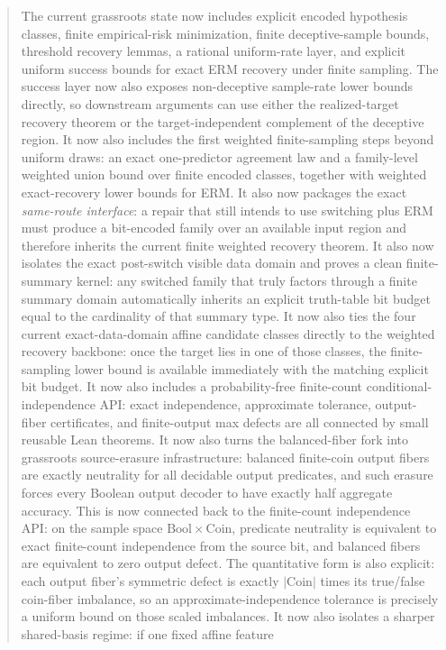 \documentclass[11pt]{article}
\theoremstyle{remark}
\begin{document}
\begin{abstract}
The current grassroots state now includes explicit encoded hypothesis classes,
finite empirical-risk minimization, finite deceptive-sample bounds, threshold
recovery lemmas, a rational uniform-rate layer, and explicit uniform success
bounds for exact ERM recovery under finite sampling.  The success layer now
also exposes non-deceptive sample-rate lower bounds directly, so downstream
arguments can use either the realized-target recovery theorem or the
target-independent complement of the deceptive region.  It now also includes
the first weighted finite-sampling steps beyond uniform draws: an exact
one-predictor agreement law and a family-level weighted union bound over finite
encoded classes, together with weighted exact-recovery lower bounds for ERM.
It also now packages the exact \emph{same-route interface}: a repair that still
intends to use switching plus ERM must produce a bit-encoded family over an
available input region and therefore inherits the current finite weighted
recovery theorem.
It also now isolates the exact post-switch visible data domain and proves a clean
finite-summary kernel: any switched family that truly factors through a finite
summary domain automatically inherits an explicit truth-table bit budget equal
to the cardinality of that summary type.
It now also ties the four current exact-data-domain affine candidate classes
directly to the weighted recovery backbone: once the target lies in one of
those classes, the finite-sampling lower bound is available immediately with the
matching explicit bit budget.
It now also includes a probability-free finite-count conditional-independence
API: exact independence, approximate tolerance, output-fiber certificates, and
finite-output max defects are all connected by small reusable Lean theorems.
It now also turns the balanced-fiber fork into grassroots source-erasure
infrastructure: balanced finite-coin output fibers are exactly neutrality for
all decidable output predicates, and such erasure forces every Boolean output
decoder to have exactly half aggregate accuracy.
This is now connected back to the finite-count independence API: on the sample
space \(\mathrm{Bool}\times\mathrm{Coin}\), predicate neutrality is equivalent
to exact finite-count independence from the source bit, and balanced fibers are
equivalent to zero output defect.
The quantitative form is also explicit: each output fiber's symmetric defect is
exactly \(|\mathrm{Coin}|\) times its true/false coin-fiber imbalance, so an
approximate-independence tolerance is precisely a uniform bound on those scaled
imbalances.
It now also isolates a sharper shared-basis regime: if one fixed affine feature

\end{abstract}
\end{document}

